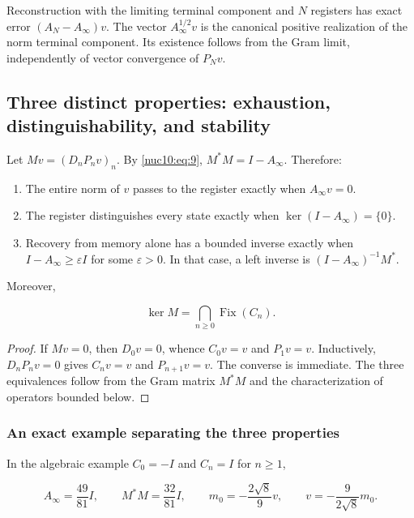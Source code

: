 Reconstruction with the limiting terminal component and \(N\) registers has exact error \((A_N-A_\infty)v\). The vector \(A_\infty^{1/2}v\) is the canonical positive realization of the norm terminal component. Its existence follows from the Gram limit, independently of vector convergence of \(P_Nv\).

\subsection{Three distinct properties: exhaustion, distinguishability, and stability}

Let \(Mv=(D_nP_nv)_n\). By \eqref{nuc10:eq:9}, \(M^*M=I-A_\infty\). Therefore:

\begin{enumerate}
\item The entire norm of \(v\) passes to the register exactly when \(A_\infty v=0\).
\item The register distinguishes every state exactly when \(\ker(I-A_\infty)=\{0\}\).
\item Recovery from memory alone has a bounded inverse exactly when \(I-A_\infty\geq\varepsilon I\) for some \(\varepsilon>0\).
In that case, a left inverse is \((I-A_\infty)^{-1}M^*\).
\end{enumerate}

Moreover,

\begin{equation}
\boxed{\ker M=\bigcap_{n\ge0}\operatorname{Fix}(C_n).}
\label{nuc10:eq:12}
\end{equation}

\begin{proof}
If \(Mv=0\), then \(D_0v=0\), whence \(C_0v=v\) and \(P_1v=v\). Inductively, \(D_nP_nv=0\) gives \(C_nv=v\) and \(P_{n+1}v=v\). The converse is immediate. The three equivalences follow from the Gram matrix \(M^*M\) and the characterization of operators bounded below.
\end{proof}

\subsubsection{An exact example separating the three properties}

In the algebraic example \(C_0=-I\) and \(C_n=I\) for \(n\geq1\),

\begin{equation}
A_\infty=\frac{49}{81}I,\qquad M^*M=\frac{32}{81}I,
\qquad m_0=-\frac{2\sqrt8}{9}v,
\qquad v=-\frac9{2\sqrt8}m_0.
\label{nuc10:eq:13}
\end{equation}

